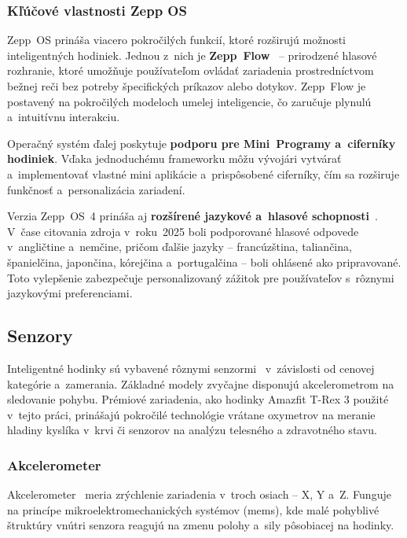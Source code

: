 \subsubsection{Kľúčové vlastnosti Zepp OS}

Zepp~OS prináša viacero pokročilých funkcií, ktoré rozširujú možnosti
inteligentných hodiniek. Jednou z~nich je \textbf{Zepp~Flow}~\cite{zepp-flow}
-- prirodzené hlasové rozhranie, ktoré umožňuje používateľom ovládať
zariadenia prostredníctvom bežnej reči bez potreby špecifických príkazov
alebo dotykov. Zepp~Flow je postavený na pokročilých modeloch umelej
inteligencie, čo zaručuje plynulú a~intuitívnu interakciu.

Operačný systém ďalej poskytuje \textbf{podporu pre Mini~Programy
a~ciferníky hodiniek}. Vďaka jednoduchému frameworku môžu vývojári
vytvárať a~implementovať vlastné mini aplikácie a~prispôsobené ciferníky,
čím sa rozširuje funkčnosť a~personalizácia zariadení.

Verzia Zepp~OS~4 prináša aj \textbf{rozšírené jazykové a~hlasové
schopnosti}~\cite{zepp-voice}. V~čase citovania zdroja v~roku~2025
boli podporované hlasové odpovede v~angličtine a~nemčine, pričom
ďalšie jazyky -- francúzština, taliančina, španielčina, japončina,
kórejčina a~portugalčina -- boli ohlásené ako pripravované. Toto
vylepšenie zabezpečuje personalizovaný zážitok pre používateľov
s~rôznymi jazykovými preferenciami.

\subsection{Senzory}

Inteligentné hodinky sú vybavené rôznymi senzormi~\cite{sensors-article}
v~závislosti od cenovej kategórie a~zamerania. Základné modely
zvyčajne disponujú akcelerometrom na sledovanie pohybu.
Prémiové zariadenia, ako hodinky Amazfit T-Rex 3 použité
v~tejto práci, prinášajú pokročilé technológie vrátane
oxymetrov na meranie hladiny kyslíka v~krvi či senzorov
na analýzu telesného a zdravotného stavu.

\subsubsection{Akcelerometer}

Akcelerometer~\cite{sensors-article} meria zrýchlenie
zariadenia v~troch osiach -- X, Y a~Z. Funguje na princípe
mikroelektromechanických systémov (\Gls{mems}),
kde malé pohyblivé štruktúry vnútri senzora
reagujú na zmenu polohy a~sily pôsobiacej na
hodinky.

